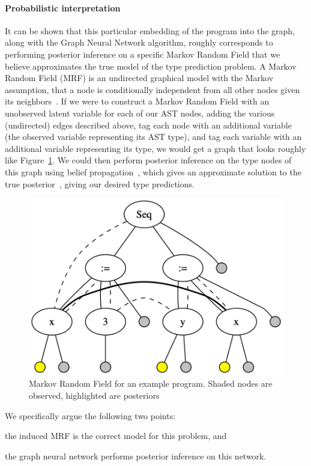 \paragraph{Probabilistic interpretation}

It can be shown that this particular embedding of the program into the graph, along with the Graph Neural Network algorithm, roughly corresponds to performing posterior inference on a specific Markov Random Field that we believe approximates the true model of the type prediction problem.
A Markov Random Field (MRF) is an undirected graphical model with the Markov assumption, that a node is conditionally independent from all other nodes given its neighbors~\cite{kinderman80markov}.
If we were to construct a Markov Random Field with an unobserved latent variable for each of our AST nodes, adding the various (undirected) edges described above, tag each node with an additional variable (the observed variable representing its AST type), and tag each variable with an additional variable representing its type, we would get a graph that looks roughly like Figure~\ref{fig:mrf-graph}.
We could then perform posterior inference on the type nodes of this graph using belief propagation~\cite{pearl2009causality}, which gives an approximate solution to the true posterior~\cite{weiss2000correctness}, giving our desired type predictions.
\begin{figure}
  \centering
  \includegraphics[width=\linewidth]{img/mrf_graph}
  \caption{Markov Random Field for an example program. Shaded nodes are observed, highlighted are posteriors}
  \label{fig:mrf-graph}
\end{figure}

We specifically argue the following two points:
\begin{enumerate*}[label=(\roman*)]
\item the induced MRF is the correct model for this problem, and
\item the graph neural network performs posterior inference on this network.
\end{enumerate*}

